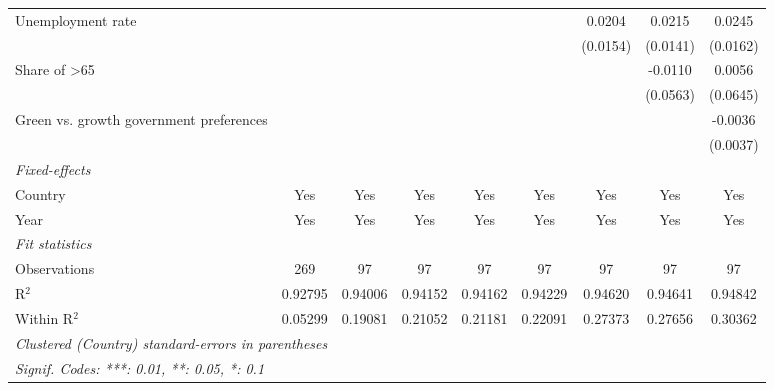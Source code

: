 \begin{table}[htbp]
\begin{tabular}{lcccccccc}
      Unemployment rate                       &               &                &              &              &               & 0.0204        & 0.0215        & 0.0245\\   
                                              &               &                &              &              &               & (0.0154)      & (0.0141)      & (0.0162)\\   
      Share of >65                            &               &                &              &              &               &               & -0.0110       & 0.0056\\   
                                              &               &                &              &              &               &               & (0.0563)      & (0.0645)\\   
      Green vs. growth government preferences &               &                &              &              &               &               &               & -0.0036\\   
                                              &               &                &              &              &               &               &               & (0.0037)\\   
      \midrule
      \emph{Fixed-effects}\\
      Country                                 & Yes           & Yes            & Yes          & Yes          & Yes           & Yes           & Yes           & Yes\\  
      Year                                    & Yes           & Yes            & Yes          & Yes          & Yes           & Yes           & Yes           & Yes\\  
      \midrule
      \emph{Fit statistics}\\
      Observations                            & 269           & 97             & 97           & 97           & 97            & 97            & 97            & 97\\  
      R$^2$                                   & 0.92795       & 0.94006        & 0.94152      & 0.94162      & 0.94229       & 0.94620       & 0.94641       & 0.94842\\  
      Within R$^2$                            & 0.05299       & 0.19081        & 0.21052      & 0.21181      & 0.22091       & 0.27373       & 0.27656       & 0.30362\\  
      \midrule \midrule
      \multicolumn{9}{l}{\emph{Clustered (Country) standard-errors in parentheses}}\\
      \multicolumn{9}{l}{\emph{Signif. Codes: ***: 0.01, **: 0.05, *: 0.1}}\\
   \end{tabular}
\end{table}


